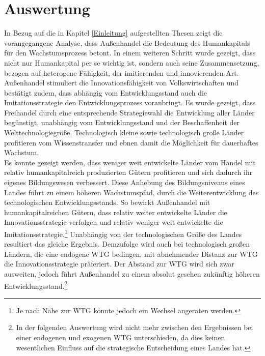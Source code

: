 \chapter{Auswertung}\label{Auswertung}

In Bezug auf die in Kapitel \ref{Einleitung} aufgestellten Thesen zeigt die vorangegangene Analyse, dass Au{\ss}enhandel die Bedeutung des Humankapitals f{\"u}r den Wachstumsprozess betont. In einem weiteren Schritt wurde gezeigt, dass nicht nur Humankapital per se wichtig ist, sondern auch seine Zusammensetzung,  bezogen auf heterogene F{\"a}higkeit, der imitierenden und innovierenden Art. Au{\ss}enhandel stimuliert die Innovationsf{\"a}higkeit von Volkswirtschaften und best{\"a}tigt zudem, dass abh{\"a}ngig vom Entwicklungsstand auch die Imitationsstrategie den Entwicklungsprozess voranbringt. Es wurde gezeigt, dass Freihandel durch eine entsprechende Strategiewahl die Entwicklung aller L{\"a}nder beg{\"u}nstigt, unabh{\"a}ngig vom Entwicklungsstand und der Beschaffenheit der Welttechnologiegr{\"o}{\ss}e. Technologisch kleine sowie technologisch gro{\ss}e L{\"a}nder profitieren vom Wissenstransfer und ebnen damit die M{\"o}glichkeit f{\"u}r dauerhaftes Wachstum.\\
Es konnte gezeigt werden, dass weniger weit entwickelte L{\"a}nder vom Handel mit relativ humankapitalreich produzierten G{\"u}tern profitieren und sich dadurch ihr eigenes Bildungswesen verbessert. Diese Anhebung des Bildungsniveaus eines Landes f{\"u}hrt zu einem h{\"o}heren Wachstumspfad, durch die Weiterentwicklung des technologischen Entwicklungsstands. So bewirkt Au{\ss}enhandel mit humankapitalreichen G{\"u}tern, dass relativ weiter entwickelte L{\"a}nder die Innovationsstrategie verfolgen und relativ weniger weit entwickelte die Imitationsstrategie.\footnote{Je nach N{\"a}he zur WTG k{\"o}nnte jedoch ein Wechsel angeraten werden.} Unabh{\"a}ngig von der technologischen Gr{\"o}{\ss}e des Landes resultiert das gleiche Ergebnis. Demzufolge wird auch bei technologisch gro{\ss}en L{\"a}ndern, die eine endogene WTG bedingen, mit abnehmender Distanz zur WTG die Innovationsstrategie pr{\"a}feriert. Der Abstand zur WTG wird sich zwar ausweiten, jedoch f{\"u}hrt Au{\ss}enhandel zu einem absolut gesehen zuk{\"u}nftig h{\"o}heren Entwicklungsstand.\footnote{In der folgenden Auswertung wird nicht mehr zwischen den Ergebnissen bei einer endogenen und exogenen WTG unterschieden, da dies keinen wesentlichen Einfluss auf die strategische Entscheidung eines Landes hat.}\newline
